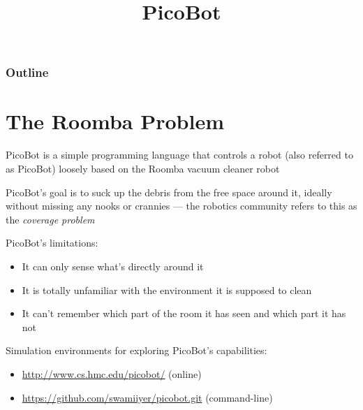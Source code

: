 \documentclass[8pt,a4paper,compress]{beamer}
\title{PicoBot}
\date{}
\begin{document}
\begin{frame}
\vfill
\titlepage
\end{frame}

\begin{frame}
\frametitle{Outline}
\tableofcontents
\end{frame}

\section{The Roomba Problem}
\begin{frame}[fragile]
\pause

PicoBot is a simple programming language that controls a robot (also referred to as PicoBot) loosely based on the Roomba vacuum cleaner robot

\pause
\bigskip

PicoBot's goal is to suck up the debris from the free space around it, ideally without missing any nooks or crannies --- the robotics community refers to this as the \emph{coverage problem}

\pause
\bigskip

PicoBot's limitations:
\begin{itemize}
\item It can only sense what's directly around it

\item It is totally unfamiliar with the environment it is supposed to clean

\item It can't remember which part of the room it has seen and which part it has not
\end{itemize}

\pause
\bigskip

Simulation environments for exploring PicoBot's capabilities:
\begin{itemize}
\item \href{http://www.cs.hmc.edu/picobot/}{http://www.cs.hmc.edu/picobot/} (online)

\item \href{https://github.com/swamiiyer/picobot.git}{https://github.com/swamiiyer/picobot.git} (command-line)
\end{itemize}
\end{frame}
\end{document}
